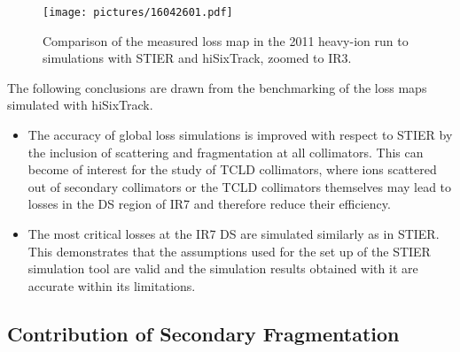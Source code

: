 \begin{figure}[t]  
    \centering
    \texttt{[image: pictures/16042601.pdf]}
    \caption{Comparison of the measured loss map in the 2011 heavy-ion run to simulations with STIER and hiSixTrack, zoomed to IR3.}  
    \label{pic:16042501}
\end{figure}

The following conclusions are drawn from the benchmarking of the loss maps simulated with hiSixTrack. 

\begin{itemize}
  \item The accuracy of global loss simulations is improved with respect to STIER by the inclusion of scattering and fragmentation at all collimators. This can become of interest for the study of TCLD collimators, where ions scattered out of secondary collimators or the TCLD collimators themselves may lead to losses in the DS region of IR7 and therefore reduce their efficiency. 
  \item The most critical losses at the IR7 DS are simulated similarly as in STIER. This demonstrates that the assumptions used for the set up of the STIER simulation tool are valid and the simulation results obtained with it are accurate within its limitations. 
\end{itemize}




\subsection{Contribution of Secondary Fragmentation}

